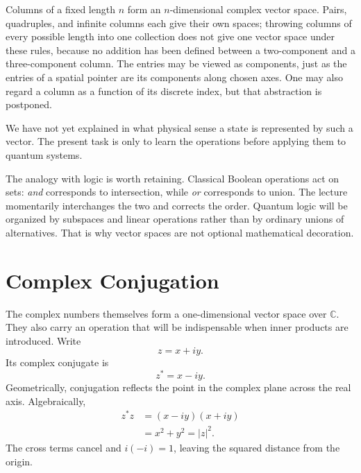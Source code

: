 Columns of a fixed length \(n\) form an \(n\)-dimensional complex vector
space. Pairs, quadruples, and infinite columns each give their own spaces;
throwing columns of every possible length into one collection does not give
one vector space under these rules, because no addition has been defined
between a two-component and a three-component column. The entries may be
viewed as components, just as the entries of a spatial pointer are its
components along chosen axes. One may also regard a column as a function of
its discrete index, but that abstraction is postponed.

We have not yet explained in what physical sense a state is represented by
such a vector. The present task is only to learn the operations before
applying them to quantum systems.

\begin{classroomqa}
\end{classroomqa}

The analogy with logic is worth retaining. Classical Boolean operations act
on sets: \emph{and} corresponds to intersection, while \emph{or} corresponds
to union. The lecture momentarily interchanges the two and corrects the
order. Quantum logic will be organized by subspaces and linear operations
rather than by ordinary unions of alternatives. That is why vector spaces
are not optional mathematical decoration.

\section{Complex Conjugation}

The complex numbers themselves form a one-dimensional vector space over
\(\mathbb C\). They also carry an operation that will be indispensable when
inner products are introduced. Write
\begin{equation}
 z=x+iy.
\end{equation}
Its complex conjugate is
\begin{equation}
 z^\ast=x-iy.
\end{equation}
Geometrically, conjugation reflects the point in the complex plane across
the real axis. Algebraically,
\begin{align}
 z^\ast z
 &=(x-iy)(x+iy)\\
 &=x^2+y^2
 =|z|^2.
 \label{eq:l01-complex-magnitude}
\end{align}
The cross terms cancel and \(i(-i)=1\), leaving the squared distance from the
origin.

